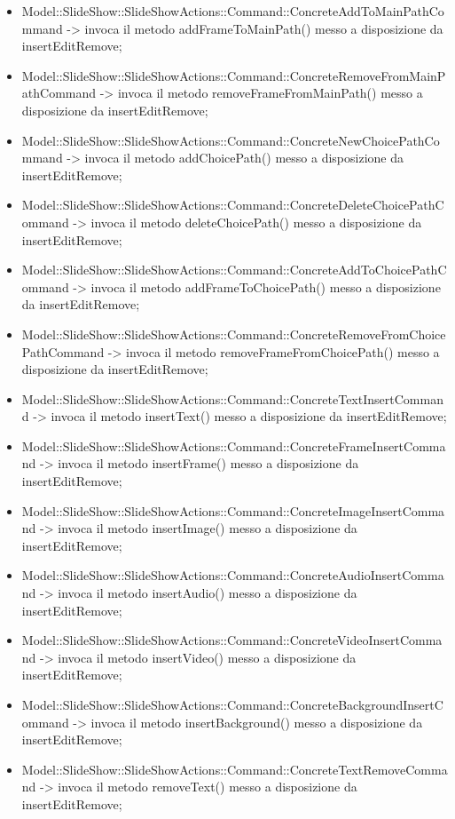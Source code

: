{\begin{itemize}
			\item Model::\-SlideShow::\-SlideShowActions::\-Command::\-ConcreteAddToMainPathCommand -> invoca il metodo addFrameToMainPath() messo a disposizione da insertEditRemove;
			\item Model::\-SlideShow::\-SlideShowActions::\-Command::\-ConcreteRemoveFromMainPathCommand -> invoca il metodo removeFrameFromMainPath() messo a disposizione da insertEditRemove;
			\item Model::\-SlideShow::\-SlideShowActions::\-Command::\-ConcreteNewChoicePathCommand -> invoca il metodo addChoicePath() messo a disposizione da insertEditRemove;
			\item Model::\-SlideShow::\-SlideShowActions::\-Command::\-ConcreteDeleteChoicePathCommand -> invoca il metodo deleteChoicePath() messo a disposizione da insertEditRemove;
			\item Model::\-SlideShow::\-SlideShowActions::\-Command::\-ConcreteAddToChoicePathCommand -> invoca il metodo addFrameToChoicePath() messo a disposizione da insertEditRemove;
			\item Model::\-SlideShow::\-SlideShowActions::\-Command::\-ConcreteRemoveFromChoicePathCommand -> invoca il metodo removeFrameFromChoicePath() messo a disposizione da insertEditRemove;
					\item Model::\-SlideShow::\-SlideShowActions::\-Command::\-ConcreteTextInsertCommand -> invoca il metodo insertText() messo a disposizione da insertEditRemove;
		\item Model::\-SlideShow::\-SlideShowActions::\-Command::\-ConcreteFrameInsertCommand -> invoca il metodo insertFrame() messo a disposizione da insertEditRemove;
		\item Model::\-SlideShow::\-SlideShowActions::\-Command::\-ConcreteImageInsertCommand -> invoca il metodo insertImage() messo a disposizione da insertEditRemove;
		\item Model::\-SlideShow::\-SlideShowActions::\-Command::\-ConcreteAudioInsertCommand -> invoca il metodo insertAudio() messo a disposizione da insertEditRemove;
		\item Model::\-SlideShow::\-SlideShowActions::\-Command::\-ConcreteVideoInsertCommand -> invoca il metodo insertVideo() messo a disposizione da insertEditRemove;
		\item Model::\-SlideShow::\-SlideShowActions::\-Command::\-ConcreteBackgroundInsertCommand -> invoca il metodo insertBackground() messo a disposizione da insertEditRemove;
		\item Model::\-SlideShow::\-SlideShowActions::\-Command::\-ConcreteTextRemoveCommand -> invoca il metodo removeText() messo a disposizione da insertEditRemove;

\end{itemize}}
